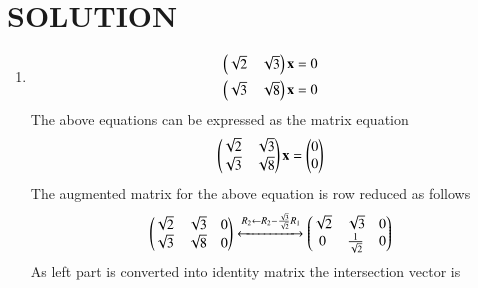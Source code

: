 \documentclass[journal,12pt,twocolumn]{IEEEtran}
\begin{document}
\section{SOLUTION}  
\begin{enumerate}
\item
\begin{align}
\begin{split}
\begin{pmatrix}\sqrt{2}& \sqrt{3} \end{pmatrix}\mathbf{x}&=0
\\
\begin{pmatrix}\sqrt{3}& \sqrt{8} \end{pmatrix}\mathbf{x}&=0
\end{split}
\end{align}
The above equations can be expressed as the matrix equation
\begin{align}
\begin{pmatrix}\sqrt{2} & \sqrt {3}\\\sqrt{3} & \sqrt{8}\end{pmatrix} \mathbf{x} = \begin{pmatrix}0\\0\end{pmatrix}
\end{align}
%
The augmented matrix for the above equation is row reduced as follows
\begin{align}
\begin{pmatrix}\sqrt{2} & \sqrt{3}& 0\\\sqrt {3}& \sqrt{8}& 0\end{pmatrix} 
\xleftrightarrow {R_2\leftarrow R_2-\frac{\sqrt{3}}{\sqrt{2}}R_1}\begin{pmatrix}\sqrt{2}& \sqrt{3}& 0\\0 & \frac{1}{\sqrt{2}}& 0\end{pmatrix}
\\ 
\end{align}%
As left part is converted into identity matrix the intersection vector is


\end{enumerate}
\end{document}
